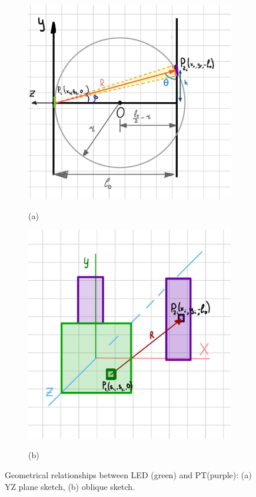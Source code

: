 \begin{figure}[H]
  \centering
  \begin{subfigure}[b]{0.3\textwidth}
    \includegraphics[width=\textwidth]{figs/simplified_model_notebook.jpg}
    \label{fig:sketch_ZY}
      \caption*{(a)}
    \end{subfigure}
    \begin{subfigure}[b]{0.32\textwidth}
      \includegraphics[width=\textwidth]{figs/oblique_draft.jpg}
      \label{fig:sketch_oblique}
      \caption*{(b)}
    \end{subfigure}
  \caption{Geometrical relationships between LED (green) and PT(purple): (a) YZ plane sketch, (b) oblique sketch.}
  \label{fig:LED_PT_scetch}
\end{figure}

